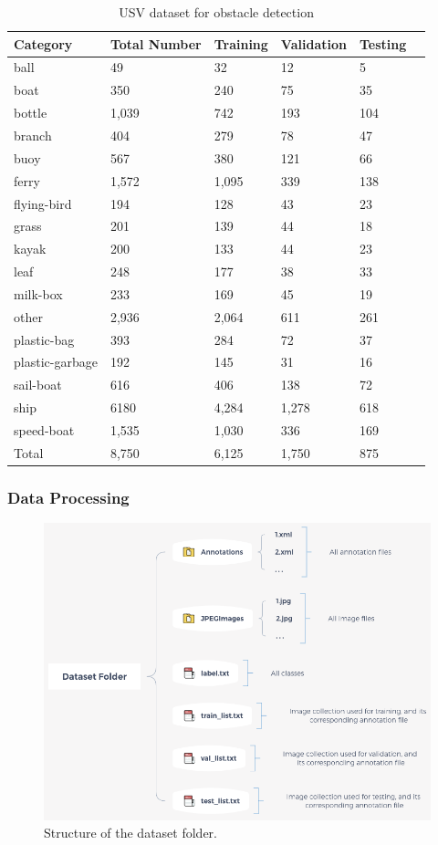 \documentclass[journal,article,submit,moreauthors,pdftex]{Definitions/mdpi}
\begin{document}
\begin{table}[htbp]
\centering
\caption{USV dataset for obstacle detection}
\begin{tabular}{llllll} 
\toprule
\textbf{Category}&\textbf{Total Number}&\textbf{Training}&\textbf{Validation}&\textbf{Testing}\\
\midrule
ball& 49& 32& 12& 5 \\
boat& 350& 240& 75& 35 \\
bottle& 1,039& 742& 193& 104 \\
branch& 404& 279& 78& 47 \\
buoy& 567& 380& 121& 66 \\
ferry& 1,572& 1,095& 339& 138 \\
flying-bird& 194& 128& 43& 23 \\
grass& 201& 139& 44& 18 \\
kayak& 200& 133& 44& 23 \\
leaf& 248& 177& 38& 33 \\
milk-box& 233& 169& 45& 19 \\
other& 2,936& 2,064& 611& 261 \\
plastic-bag& 393& 284& 72& 37 \\
plastic-garbage& 192& 145& 31& 16 \\
sail-boat& 616& 406& 138& 72 \\
ship& 6180& 4,284& 1,278& 618 \\
speed-boat& 1,535& 1,030& 336& 169 \\
\cmidrule(r){1-5}
Total& 8,750& 6,125& 1,750& 875 \\
\bottomrule
\end{tabular}
\label{tbl:USV dataset for obstacle detection}
\end{table}



\subsubsection{Data Processing}
\begin{figure}[htbp]
\centering
\includegraphics[width=1\columnwidth]{images/dataset-folder.png}
\caption{Structure of the dataset folder.}
\label{fig:Structure of the dataset folder}
\end{figure}
\end{document}
